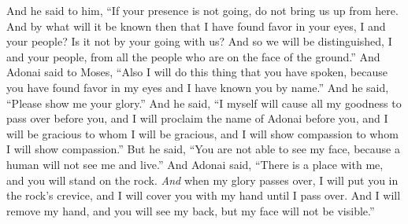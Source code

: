 \begin{biblechapter}
\verse And he said to him, “If your presence is not going, do not bring us up from here.
\verse And by what will it be known then that I have found favor in your eyes, I and your people? Is it not by your going with us? And so we will be distinguished, I and your people, from all the people who are on the face of the ground.”
\verse And Adonai said to Moses, “Also I will do this thing that you have spoken, because you have found favor in my eyes and I have known you by name.”
\verse And he said, “Please show me your glory.”
\verse And he said, “I myself will cause all my goodness to pass over before you, and I will proclaim the name of Adonai before you, and I will be gracious to whom I will be gracious, and I will show compassion to whom I will show compassion.”
\verse But he said, “You are not able to see my face, because a human will not see me and live.”
\verse And Adonai said, “There is a place with me, and you will stand on the rock.
\verse \textit{And} when my glory passes over, I will put you in the rock’s crevice, and I will cover you with my hand until I pass over.
\verse And I will remove my hand, and you will see my back, but my face will not be visible.”
\end{biblechapter}

